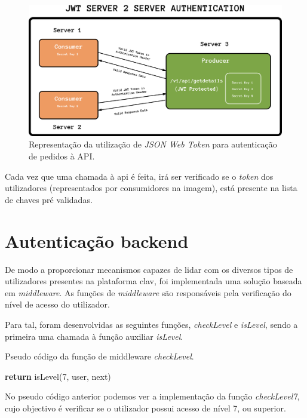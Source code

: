 \begin{figure}[h]
    \centering
    \includegraphics[width=\textwidth]{img/jwt/jwtAPI.png}
    \caption{Representação da utilização de \emph{JSON Web Token} para autenticação de pedidos à API. \cite{jwtAPI}}
\end{figure}

Cada vez que uma chamada à \gls{api} é feita, irá ser verificado se o \emph{token} dos utilizadores (representados por consumidores na imagem), está presente na lista de chaves pré validadas.

\cleardoublepage
\section{Autenticação backend}

De modo a proporcionar mecanismos capazes de lidar com os diversos tipos de utilizadores presentes na plataforma \gls{clav}, foi implementada uma solução baseada em \emph{middleware}. As funções de \emph{middleware} são responsáveis pela verificação do nível de acesso do utilizador. 

Para tal, foram desenvolvidas as seguintes funções, \emph{checkLevel} e \emph{isLevel}, sendo a primeira uma chamada à função auxiliar \emph{isLevel}.

\begin{algorithm}
    \caption{Pseudo código da função de middleware \emph{checkLevel}.}
    \begin{algorithmic}[1]
            \State \textbf{return} isLevel(7, user, next)
    \EndFunction
    \end{algorithmic}
\end{algorithm}

No pseudo código anterior podemos ver a implementação da função \emph{checkLevel7}, cujo objectivo é verificar se o utilizador possui acesso de nível 7, ou superior.

